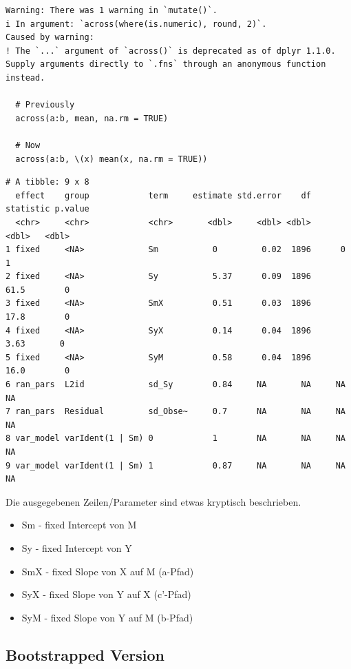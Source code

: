 \documentclass[
  letterpaper,
  DIV=11,
  numbers=noendperiod]{scrreprt}
\providecommand{\tightlist}{%
  \setlength{\itemsep}{0pt}\setlength{\parskip}{0pt}}\usepackage{longtable,booktabs,array}
\begin{document}
\begin{verbatim}
Warning: There was 1 warning in `mutate()`.
i In argument: `across(where(is.numeric), round, 2)`.
Caused by warning:
! The `...` argument of `across()` is deprecated as of dplyr 1.1.0.
Supply arguments directly to `.fns` through an anonymous function instead.

  # Previously
  across(a:b, mean, na.rm = TRUE)

  # Now
  across(a:b, \(x) mean(x, na.rm = TRUE))
\end{verbatim}

\begin{verbatim}
# A tibble: 9 x 8
  effect    group            term     estimate std.error    df statistic p.value
  <chr>     <chr>            <chr>       <dbl>     <dbl> <dbl>     <dbl>   <dbl>
1 fixed     <NA>             Sm           0         0.02  1896      0          1
2 fixed     <NA>             Sy           5.37      0.09  1896     61.5        0
3 fixed     <NA>             SmX          0.51      0.03  1896     17.8        0
4 fixed     <NA>             SyX          0.14      0.04  1896      3.63       0
5 fixed     <NA>             SyM          0.58      0.04  1896     16.0        0
6 ran_pars  L2id             sd_Sy        0.84     NA       NA     NA         NA
7 ran_pars  Residual         sd_Obse~     0.7      NA       NA     NA         NA
8 var_model varIdent(1 | Sm) 0            1        NA       NA     NA         NA
9 var_model varIdent(1 | Sm) 1            0.87     NA       NA     NA         NA
\end{verbatim}

Die ausgegebenen Zeilen/Parameter sind etwas kryptisch beschrieben.

\begin{itemize}
\tightlist
\item
  Sm - fixed Intercept von M
\item
  Sy - fixed Intercept von Y
\item
  SmX - fixed Slope von X auf M (a-Pfad)
\item
  SyX - fixed Slope von Y auf X (c'-Pfad)
\item
  SyM - fixed Slope von Y auf M (b-Pfad)
\end{itemize}

\subsection{Bootstrapped Version}\label{bootstrapped-version}
\end{document}
